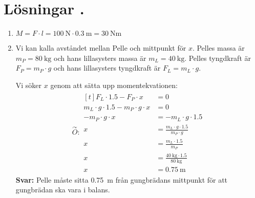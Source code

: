 \documentclass[11pt]{article}
\begin{document}
\section*{Lösningar \thesection.}
\begin{enumerate}[itemsep=2em]
        \item
              \begin{minipage}[t]{0.5\textwidth}
                      $M = F \cdot l = \SI{100}{\newton} \cdot \SI{0.3}{\meter} = \SI{30}{\newton\metre}$
              \end{minipage}
              \hspace{1em}
              \begin{adjustbox}{valign=t}
                      
              \end{adjustbox}
        \item
              Vi kan kalla avståndet mellan Pelle och mittpunkt för $x$. Pelles massa är $m_P = \SI{80}{\kilogram}$ och hans lillasysters massa är $m_L = \SI{40}{\kilogram}$. Pelles tyngdkraft är $F_P = m_P \cdot g$ och hans lillasysters tyngdkraft är $F_L = m_L \cdot g$.

              Vi söker $x$ genom att sätta upp momentekvationen:
              \begin{align*}
                      \overset{\curvearrowright}{O} : \begin{aligned}[t]
                                                              F_L \cdot 1.5 - F_P \cdot x                 & = 0                                                       \\
                                                              m_L \cdot g \cdot 1.5 - m_P \cdot g \cdot x & = 0                                                       \\
                                                              -m_P \cdot g \cdot x                        & = -m_L \cdot g \cdot 1.5                                  \\
                                                              x                                           & = \frac{m_L \cdot g \cdot 1.5}{m_P \cdot g}               \\
                                                              x                                           & = \frac{m_L \cdot 1.5}{m_P}                               \\
                                                              x                                           & = \frac{\SI{40}{\kilogram} \cdot 1.5}{\SI{80}{\kilogram}} \\
                                                              x                                           & = \SI{0.75}{\meter}
                                                      \end{aligned}
              \end{align*}
              \textbf{Svar:} Pelle måste sitta \SI{0.75}{\meter} från gungbrädans mittpunkt för att gungbrädan ska vara i balans.


\end{enumerate}
\end{document}
